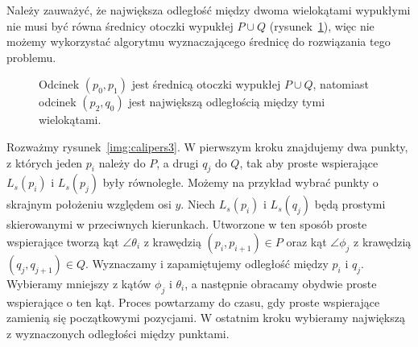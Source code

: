 Należy zauważyć, że największa odległość między dwoma wielokątami
wypukłymi nie musi być równa średnicy otoczki wypukłej $P \cup Q$
(rysunek~\ref{fig:maxdist}), więc nie możemy wykorzystać algorytmu
wyznaczającego średnicę do rozwiązania tego problemu.

\begin{figure}[htb]
  \centering
  \caption{\label{fig:maxdist} Odcinek $(p_0, p_1)$ jest średnicą otoczki
    wypukłej $P \cup Q$, natomiast odcinek $(p_2, q_0)$ jest największą
    odległością między tymi wielokątami.}
\end{figure}

Rozważmy rysunek~\ref{img:calipers3}. W pierwszym kroku znajdujemy dwa
punkty, z których jeden $p_i$ należy do $P$, a drugi $q_j$ do $Q$, tak
aby proste wspierające $L_s(p_i)$ i $L_s(p_j)$ były równoległe. Możemy
na przykład wybrać punkty o skrajnym położeniu względem osi $y$. Niech
$L_s(p_i)$ i $L_s(q_j)$ będą prostymi skierowanymi w przeciwnych
kierunkach. Utworzone w ten sposób proste wspierające tworzą kąt
$\angle{\theta_i}$ z krawędzią $(p_i, p_{i+1}) \in P$ oraz kąt
$\angle{\phi_j}$ z krawędzią $(q_j, q_{j+1}) \in Q$. Wyznaczamy i
zapamiętujemy odległość między $p_i$ i $q_j$. Wybieramy mniejszy z
kątów $\phi_j$ i $\theta_i$, a następnie obracamy obydwie proste
wspierające o ten kąt. Proces powtarzamy do czasu, gdy proste
wspierające zamienią się początkowymi pozycjami. W ostatnim kroku
wybieramy największą z wyznaczonych odległości między punktami.

